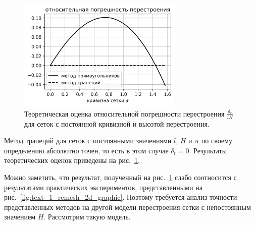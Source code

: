 \begin{figure}[h]
\onelinecaptionstrue
\centering
\includegraphics[width=0.7\textwidth]{pics/text_1_remesh_2d/delta_r_lH.png}
\caption{Теоретическая оценка относительной погрешности перестроения $\frac{\delta_r}{lH}$ для сеток с постоянной кривизной и высотой перестроения.}
\label{fig:text_1_remesh_2d_delta_r_lH}
\end{figure}

Метод трапеций для сеток с постоянными значениями $l$, $H$ и $\alpha$ по своему определению абсолютно точен, то есть в этом случае $\delta_t = 0$.
Результаты теоретических оценок приведены на рис.~\ref{fig:text_1_remesh_2d_delta_r_lH}.

Можно заметить, что результат, полученный на рис.~\ref{fig:text_1_remesh_2d_delta_r_lH} слабо соотносится с результатами практических экспериментов, представленными на рис.~\ref{fig:text_1_remesh_2d_graphic}.
Поэтому требуется анализ точности представленных методов на другой модели перестроения сетки с непостоянным значением $H$.
Рассмотрим такую модель.